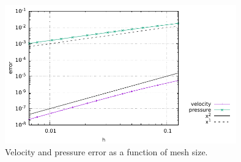 \begin{center}
\includegraphics[width=10cm]{python_codes/fieldstone_06/results/errors.pdf}\\
{\captionfont Velocity and pressure error as a function of mesh size.}
\end{center}

